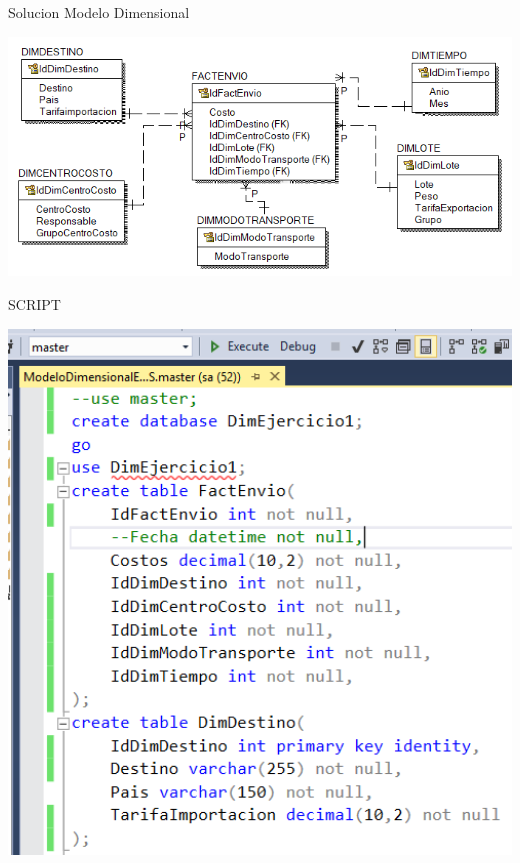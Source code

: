 \documentclass[12pt,letterpaper]{article}
\begin{document}
Solucion
Modelo Dimensional
\begin{center}
\includegraphics[width=17cm]{IMG/ejer1.png} 
\end{center}
 \newpage
SCRIPT
\begin{center}
\includegraphics[width=17cm]{IMG/sql1.png} 
\end{center}
 \newpage
\end{document}
